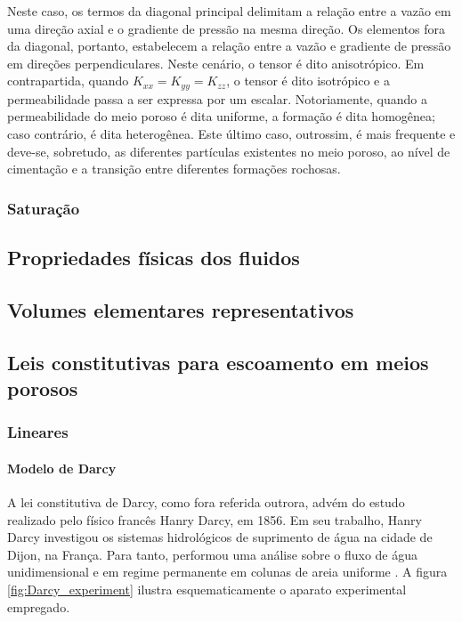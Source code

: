 Neste caso, os termos da diagonal principal delimitam a relação entre a vazão em uma direção axial e o gradiente de pressão na mesma direção. Os elementos fora da diagonal, portanto, estabelecem a relação entre a vazão e gradiente de pressão em direções perpendiculares. Neste cenário, o tensor é dito anisotrópico. Em contrapartida, quando $K_{xx} = K_{yy} = K_{zz}$, o tensor é dito isotrópico e a permeabilidade passa a ser expressa por um escalar. Notoriamente, quando a permeabilidade do meio poroso é dita uniforme, a formação é dita homogênea; caso contrário, é dita heterogênea. Este último caso, outrossim, é mais frequente e deve-se, sobretudo, as diferentes partículas existentes no meio poroso, ao nível de cimentação e a transição entre diferentes formações rochosas.

\subsubsection{Saturação}


\subsection{Propriedades físicas dos fluidos}

\subsection{Volumes elementares representativos}

\subsection{Leis constitutivas para escoamento em meios porosos}

\subsubsection{Lineares}

\paragraph{Modelo de Darcy}

A lei constitutiva de Darcy, como fora referida outrora, advém do estudo realizado pelo físico francês Hanry Darcy, em 1856. Em seu trabalho, Hanry Darcy investigou os sistemas hidrológicos de suprimento de água na cidade de Dijon, na França. Para tanto, performou uma análise sobre o fluxo de água unidimensional e em regime permanente em colunas de areia uniforme \cite{Darcy1856}. A figura \ref{fig:Darcy_experiment} ilustra esquematicamente o aparato experimental empregado. 

